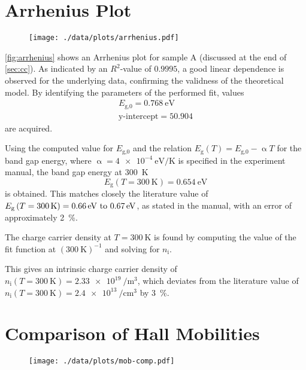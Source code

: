 \section{Arrhenius Plot}\label{sec:arrhenius}
\begin{figure}
	\centering
	\texttt{[image: ./data/plots/arrhenius.pdf]}
	\label{fig:arrhenius}
\end{figure}

\autoref{fig:arrhenius} shows an Arrhenius plot for sample A (discussed at the end of \autoref{sec:cc}).
As indicated by an $R^2$-value of $0.9995$, a good linear dependence is observed for the underlying data, confirming the validness of the theoretical model.
By identifying the parameters of the performed fit, values
\begin{align*}
	E_\text{g,0} = \SI{0.768}{\eV} \\
	\text{y-intercept} = \num{50.904} %
\end{align*}
are acquired.

Using the computed value for $E_\text{g,0}$ and the relation $E_\text{g}(T) = E_\text{g,0} -\upalpha T$ for the band gap energy, where $\upalpha=\SI{4e-4}{\eV\per\kelvin}$ is specified in the experiment manual, the band gap energy at \SI{300}{\kelvin}
\begin{equation*}
	E_\text{g}\left(T = \SI{300}{\kelvin}\right) = \SI{0.654}{\eV}
\end{equation*}
is obtained.
This matches closely the literature value of $E_\text{g}\left(T = \SI{300}{\kelvin}\right) = \text{\SIrange{0.66}{0.67}{\eV}}$, as stated in the manual, with an error of approximately \SI{2}{\percent}.

The charge carrier density at $T = \SI{300}{\kelvin}$ is found by computing the value of the fit function at $\left(\SI{300}{\kelvin}\right)^{-1}$ and solving for $n_\text{i}$.

This gives an intrinsic charge carrier density of $n_\text{i} (T=\SI{300}{\kelvin}) = \SI{2.33e19}{\per\meter\cubed}$, which deviates from the literature value of $n_\text{i} (T=\SI{300}{\kelvin}) = \SI{2.4e13}{\per\centi\meter\cubed}$ by \SI{3}{\percent}.

\section{Comparison of Hall Mobilities}
\begin{figure}
  \centering
  \texttt{[image: ./data/plots/mob-comp.pdf]}
  \label{fig:mob-comp}
\end{figure}

